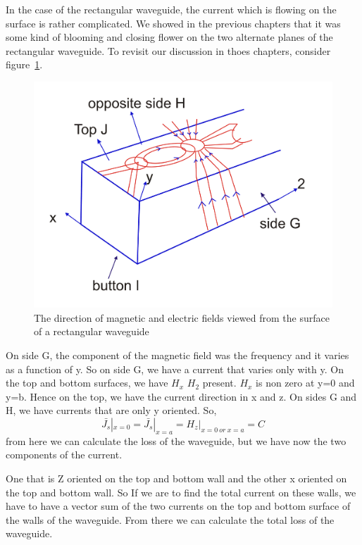 In the case of the rectangular waveguide, the current which is flowing on the surface is rather complicated. We showed in the previous chapters that it was some kind of blooming and closing flower on the two alternate planes of the rectangular waveguide. To revisit our discussion in thoes chapters, consider figure~\ref{fig:lecture2-image-a}. 
\begin{figure}[h]
\centering
\includegraphics[width=1\linewidth]{./graphics/lecture2-image-a.png}
\caption{The direction of magnetic and electric fields viewed from the surface of a rectangular waveguide}
\label{fig:lecture2-image-a}
\end{figure}

On side G, the component of the magnetic field was the frequency and it varies as a function of y. So on side G, we have a current that varies only with y. On the top and bottom surfaces, we have $H_x$ $H_2$ present. $H_x$ is non zero at y=0 and y=b.
Hence on the top, we have the current direction in x and z.
On sides G and H, we have currents that are only y oriented. So,
$$
\bar{J_s}|_{x=0} = \bar{J_s}|_{x=a} = H_z|_{x=0 \ or \ x=a}=C
$$
from here we can calculate the loss of the waveguide, but we have now the two components of the current.

One that is Z oriented on the top and bottom wall and the other x oriented on the top and bottom wall. So If we are to find the total current on these walls, we have to have a vector sum of the two currents on the top and bottom surface of the walls of the waveguide. From there we can calculate the total loss of the waveguide.


